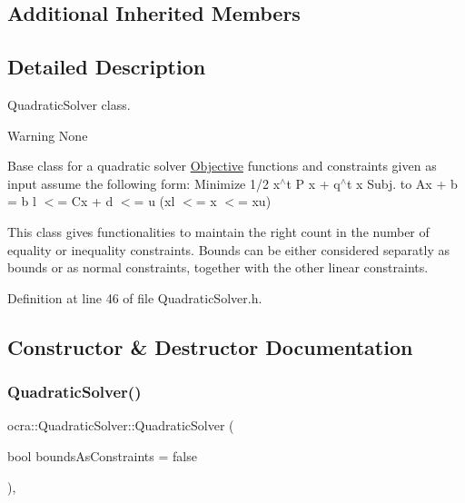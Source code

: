 \subsection*{Additional Inherited Members}


\subsection{Detailed Description}
Quadratic\+Solver class. 

\begin{DoxyWarning}{Warning}
None
\end{DoxyWarning}
Base class for a quadratic solver \hyperlink{classocra_1_1Objective}{Objective} functions and constraints given as input assume the following form\+: Minimize 1/2 x$^\wedge$t P x + q$^\wedge$t x Subj. to Ax + b = b\textquotesingle{} l $<$= Cx + d $<$= u (xl $<$= x $<$= xu)

This class gives functionalities to maintain the right count in the number of equality or inequality constraints. Bounds can be either considered separatly as bounds or as \textquotesingle{}normal\textquotesingle{} constraints, together with the other linear constraints. 

Definition at line 46 of file Quadratic\+Solver.\+h.



\subsection{Constructor \& Destructor Documentation}
\hypertarget{classocra_1_1QuadraticSolver_a1441484062835e6d3e1a86dbf8fa3eb2}{}\label{classocra_1_1QuadraticSolver_a1441484062835e6d3e1a86dbf8fa3eb2} 
\subsubsection{\texorpdfstring{Quadratic\+Solver()}{QuadraticSolver()}}
{\footnotesize\ttfamily ocra\+::\+Quadratic\+Solver\+::\+Quadratic\+Solver (\begin{DoxyParamCaption}\item[{bool}]{bounds\+As\+Constraints = {\ttfamily false} }\end{DoxyParamCaption})\hspace{0.3cm}{\ttfamily [inline]}, {\ttfamily [protected]}}

